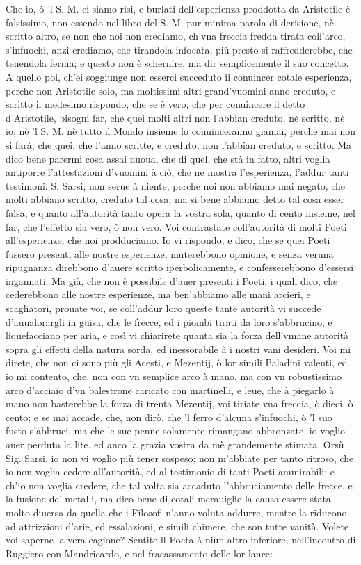 \documentclass[11pt,twoside,openany]{book}
\begin{document}
Che io, ò 'l S. M. ci siamo risi, e burlati dell'esperienza proddotta da Aristotile è falsissimo, non essendo nel libro del S. M. pur minima parola di derisione, nè scritto altro, se non che noi non crediamo, ch'vna freccia fredda tirata coll'arco, s'infuochi, anzi crediamo, che tirandola infocata, più presto si raffredderebbe, che tenendola ferma; e questo non è schernire, ma dir semplicemente il suo concetto. A quello poi, ch'ei soggiunge non esserci succeduto il conuincer cotale esperienza, perche non Aristotile solo, ma moltissimi altri grand'vuomini anno creduto, e scritto il medesimo rispondo, che se è vero, che per conuincere il detto d'Aristotile, bisogni far, che quei molti altri non l'abbian creduto, nè scritto, nè io, nè 'l S. M. nè tutto il Mondo insieme lo conuinceranno giamai, perche mai non si farà, che quei, che l'anno scritte, e creduto, non l'abbian creduto, e scritto. Ma dico bene parermi cosa assai nuoua, che di quel, che stà in fatto, altri voglia antiporre l'attestazioni d'vuomini à ciò, che ne mostra l'esperienza, l'addur tanti testimoni. S. Sarsi, non serue à niente, perche noi non abbiamo mai negato, che molti abbiano scritto, creduto tal cosa; ma si bene abbiamo detto tal cosa esser falsa, e quanto all'autorità tanto opera la vostra sola, quanto di cento insieme, nel far, che l'effetto sia vero, ò non vero. Voi contrastate coll'autorità di molti Poeti all'esperienze, che noi prodduciamo. Io vi rispondo, e dico, che se quei Poeti fussero presenti alle nostre esperienze, muterebbono opinione, e senza veruna ripugnanza direbbono d'auere scritto iperbolicamente, e confesserebbono d'essersi ingannati. Ma già, che non è possibile d'auer presenti i Poeti, i quali dico, che cederebbono alle nostre esperienze, ma ben'abbiamo alle mani arcieri, e scagliatori, prouate voi, se coll'addur loro queste tante autorità vi succede d'auualorargli in guisa, che le frecce, ed i piombi tirati da loro s'abbrucino, e liquefacciano per aria, e così vi chiarirete quanta sia la forza dell'vmane autorità sopra gli effetti della natura sorda, ed inessorabile à i nostri vani desideri. Voi mi direte, che non ci sono più gli Acesti, e Mezentij, ò lor simili Paladini valenti, ed io mi contento, che, non con vn semplice arco à mano, ma con vn robustissimo arco d'acciaio d'vn balestrone caricato con martinelli, e leue, che à piegarlo à mano non basterebbe la forza di trenta Mezentij, voi tiriate vna freccia, ò dieci, ò cento; e se mai accade, che, non dirò, che 'l ferro d'alcuna s'infuochi, ò 'l suo fusto s'abbruci, ma che le sue penne solamente rimangano abbronzate, io voglio auer perduta la lite, ed anco la grazia vostra da mè grandemente stimata. Orsù Sig. Sarsi, io non vi voglio più tener sospeso; non m'abbiate per tanto ritroso, che io non voglia cedere all'autorità, ed al testimonio di tanti Poeti ammirabili; e ch'io non voglia credere, che tal volta sia accaduto l'abbruciamento delle frecce, e la fusione de' metalli, ma dico bene di cotali merauiglie la causa essere stata molto diuersa da quella che i Filosofi n'anno voluta addurre, mentre la riducono ad attrizzioni d'arie, ed essalazioni, e simili chimere, che son tutte vanità. Volete voi saperne la vera cagione? Sentite il Poeta à niun altro inferiore, nell'incontro di Ruggiero con Mandricardo, e nel fracassamento delle lor lance:
\end{document}
